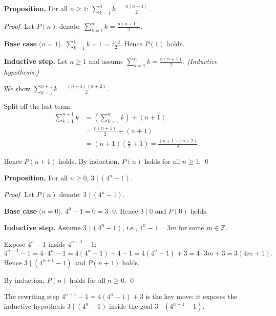 \begin{example}
\textbf{Proposition.}
For all $n \geq 1$:
$\displaystyle\sum_{k=1}^n k = \frac{n(n+1)}{2}$.

\medskip
\noindent\textit{Proof.}
Let $P(n)$ denote: $\displaystyle\sum_{k=1}^n k = \frac{n(n+1)}{2}$.

\medskip
\noindent\textbf{Base case} ($n=1$).
$\sum_{k=1}^1 k = 1 = \frac{1 \cdot 2}{2}$.
Hence $P(1)$ holds.

\medskip
\noindent\textbf{Inductive step.}
Let $n \geq 1$ and assume
$\displaystyle\sum_{k=1}^n k = \frac{n(n+1)}{2}$. \quad
\textit{(Inductive hypothesis.)}

We show $\displaystyle\sum_{k=1}^{n+1} k = \frac{(n+1)(n+2)}{2}$.

Split off the last term:
\begin{align*}
\sum_{k=1}^{n+1} k
&= \left(\sum_{k=1}^n k\right) + (n+1) \\
&= \frac{n(n+1)}{2} + (n+1)
  \tag{inductive hypothesis} \\
&= (n+1)\left(\frac{n}{2} + 1\right)
  = \frac{(n+1)(n+2)}{2}.
\end{align*}

Hence $P(n+1)$ holds. By induction, $P(n)$ holds for all $n \geq 1$. \qed
\end{example}

\begin{example}[Divisibility]
\textbf{Proposition.}
For all $n \geq 0$, $3 \mid (4^n - 1)$.

\medskip
\noindent\textit{Proof.}
Let $P(n)$ denote: $3 \mid (4^n - 1)$.

\medskip
\noindent\textbf{Base case} ($n=0$).
$4^0 - 1 = 0 = 3 \cdot 0$. Hence $3 \mid 0$ and $P(0)$ holds.

\medskip
\noindent\textbf{Inductive step.}
Assume $3 \mid (4^n - 1)$, i.e., $4^n - 1 = 3m$ for some $m \in \mathbb{Z}$.

Expose $4^n - 1$ inside $4^{n+1} - 1$:
\[
4^{n+1} - 1 = 4 \cdot 4^n - 1
= 4(4^n - 1) + 4 - 1
= 4(4^n - 1) + 3
= 4 \cdot 3m + 3
= 3(4m + 1).
\]
Hence $3 \mid (4^{n+1}-1)$ and $P(n+1)$ holds.

By induction, $P(n)$ holds for all $n \geq 0$. \qed

\medskip
\noindent
The rewriting step $4^{n+1} - 1 = 4(4^n - 1) + 3$ is the key move:
it exposes the inductive hypothesis $3 \mid (4^n - 1)$ inside
the goal $3 \mid (4^{n+1} - 1)$.
\end{example}
